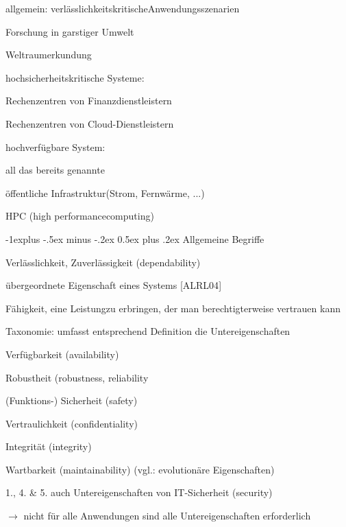 \documentclass[a4paper]{article}
\makeatletter
\renewcommand{\subsection}{\@startsection{subsection}{2}{0mm}%
 {-1explus -.5ex minus -.2ex}%
 {0.5ex plus .2ex}%
 {\normalfont\normalsize\bfseries}}
\makeatother
\begin{document}
\begin{multicols}{3}
    \begin{itemize*}
        \item
        allgemein: verlässlichkeitskritischeAnwendungsszenarien
        \item
        Forschung in garstiger Umwelt
        \item
        Weltraumerkundung
        \item
        hochsicherheitskritische Systeme:
        \begin{itemize*}
            \item Rechenzentren von Finanzdienstleistern
            \item Rechenzentren von Cloud-Dienstleistern
        \end{itemize*}
        \item
        hochverfügbare System:
        \begin{itemize*}
            \item all das bereits genannte
            \item öffentliche Infrastruktur(Strom, Fernwärme, ...)
        \end{itemize*}
        \item
        HPC (high performancecomputing)
    \end{itemize*}


    \subsection{Allgemeine Begriffe}

    \begin{itemize*}
        \item
        Verlässlichkeit, Zuverlässigkeit (dependability)
        \item
        übergeordnete Eigenschaft eines Systems {[}ALRL04{]}
        \item
        Fähigkeit, eine Leistungzu erbringen, der man berechtigterweise
        vertrauen kann
        \item
        Taxonomie: umfasst entsprechend Definition die Untereigenschaften
        \begin{enumerate*}

            \item Verfügbarkeit (availability)
            \item Robustheit (robustness, reliability
            \item (Funktions-) Sicherheit (safety)
            \item Vertraulichkeit (confidentiality)
            \item Integrität (integrity)
            \item Wartbarkeit (maintainability) (vgl.: evolutionäre Eigenschaften)
        \end{enumerate*}
        \item
        1., 4. \& 5. auch Untereigenschaften von IT-Sicherheit (security)
        \item
        $\rightarrow$  nicht für alle Anwendungen sind alle
        Untereigenschaften erforderlich
    \end{itemize*}



\end{multicols}
\end{document}
